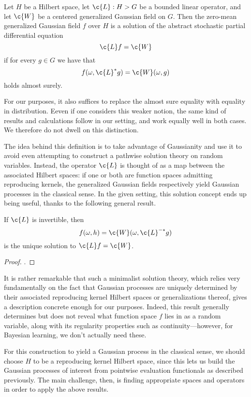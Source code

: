 \documentclass[11pt]{book}
\begin{document}
\begin{definition}
Let $H$ be a Hilbert space, let $\c{L} : H \-> G$ be a bounded linear operator, and let $\c{W}$ be a centered generalized Gaussian field on $G$.
Then the zero-mean generalized Gaussian field $f$ over $H$ is a solution of the abstract stochastic partial differential equation 
\[
\c{L} f = \c{W}    
\]
if for every $g\in G$ we have that 
\[
f(\omega,\c{L}^* g) = \c{W}(\omega,g)
\]
holds almost surely.
\end{definition}

For our purposes, it also suffices to replace the almost sure equality with equality in distribution. 
Eeven if one considers this weaker notion, the same kind of results and calculations follow in our setting, and work equally well in both cases.
We therefore do not dwell on this distinction.

The idea behind this definition is to take advantage of Gaussianity and use it to avoid even attempting to construct a pathwise solution theory on random variables.
Instead, the operator $\c{L}$ is thought of as a map between the associated Hilbert spaces: if one or both are function spaces admitting reproducing kernels, the generalized Gaussian fields respectively yield Gaussian processes in the classical sense.
In the given setting, this solution concept ends up being useful, thanks to the following general result.

\begin{result}
If $\c{L}$ is invertible, then
\[
f(\omega,h) = \c{W}(\omega, \c{L}^{-*} g)
\]
is the unique solution to $\c{L}f = \c{W}$.
\end{result}

\begin{proof}
\textcite[Theorem 4.2.2.]{lototsky17}.
\end{proof}

It is rather remarkable that such a minimalist solution theory, which relies very fundamentally on the fact that Gaussian processes are uniquely determined by their associated reproducing kernel Hilbert spaces or generalizations thereof, gives a description concrete enough for our purposes.
Indeed, this result generally determines but does not reveal what function space $f$ lies in as a random variable, along with its regularity properties such as continuity---however, for Bayesian learning, we don't actually need these.


For this construction to yield a Gaussian process in the classical sense, we should choose $H$ to be a reproducing kernel Hilbert space, since this lets us build the Gaussian processes of interest from pointwise evaluation functionals as described previously.
The main challenge, then, is finding appropriate spaces and operators in order to apply the above results.
\end{document}
